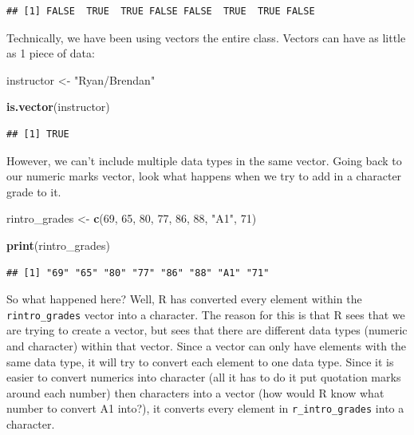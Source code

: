 \documentclass[
]{book}
\newenvironment{Shaded}{\begin{snugshade}}{\end{snugshade}}
\newcommand{\DecValTok}[1]{\textcolor[rgb]{0.00,0.00,0.81}{#1}}
\newcommand{\FunctionTok}[1]{\textcolor[rgb]{0.13,0.29,0.53}{\textbf{#1}}}
\newcommand{\NormalTok}[1]{#1}
\newcommand{\OtherTok}[1]{\textcolor[rgb]{0.56,0.35,0.01}{#1}}
\newcommand{\StringTok}[1]{\textcolor[rgb]{0.31,0.60,0.02}{#1}}
\begin{document}
\begin{verbatim}
## [1] FALSE  TRUE  TRUE FALSE FALSE  TRUE  TRUE FALSE
\end{verbatim}

Technically, we have been using vectors the entire class. Vectors can have as little as 1 piece of data:

\begin{Shaded}
\begin{Highlighting}[]
\NormalTok{instructor }\OtherTok{\textless{}{-}} \StringTok{"Ryan/Brendan"}

\FunctionTok{is.vector}\NormalTok{(instructor)}
\end{Highlighting}
\end{Shaded}

\begin{verbatim}
## [1] TRUE
\end{verbatim}

However, we can't include multiple data types in the same vector. Going back to our numeric marks vector, look what happens when we try to add in a character grade to it.

\begin{Shaded}
\begin{Highlighting}[]
\NormalTok{rintro\_grades }\OtherTok{\textless{}{-}} \FunctionTok{c}\NormalTok{(}\DecValTok{69}\NormalTok{, }\DecValTok{65}\NormalTok{, }\DecValTok{80}\NormalTok{, }\DecValTok{77}\NormalTok{, }\DecValTok{86}\NormalTok{, }\DecValTok{88}\NormalTok{, }\StringTok{"A1"}\NormalTok{, }\DecValTok{71}\NormalTok{)}


\FunctionTok{print}\NormalTok{(rintro\_grades)}
\end{Highlighting}
\end{Shaded}

\begin{verbatim}
## [1] "69" "65" "80" "77" "86" "88" "A1" "71"
\end{verbatim}

So what happened here? Well, R has converted every element within the \texttt{rintro\_grades} vector into a character. The reason for this is that R sees that we are trying to create a vector, but sees that there are different data types (numeric and character) within that vector. Since a vector can only have elements with the same data type, it will try to convert each element to one data type. Since it is easier to convert numerics into character (all it has to do it put quotation marks around each number) then characters into a vector (how would R know what number to convert A1 into?), it converts every element in \texttt{r\_intro\_grades} into a character.
\end{document}
